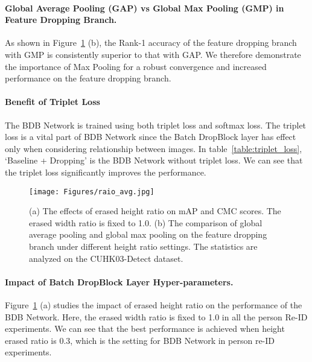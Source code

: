 \paragraph{Global Average Pooling (GAP) vs Global Max Pooling (GMP) in Feature Dropping Branch.}\vspace{-4mm}
As shown in Figure~\ref{fig:cuhk_ratio} (b), the Rank-1 accuracy of the feature dropping branch with GMP is consistently superior to that with GAP.
We therefore demonstrate the importance of Max Pooling \textcolor{myRed}{for} a robust convergence and increased performance on the feature dropping branch.

\paragraph{Benefit of Triplet Loss}\vspace{-4mm}
The BDB Network is trained using both triplet loss and softmax loss. The triplet loss is a vital part of BDB Network since the Batch DropBlock layer has effect only when considering relationship between images. In table~\ref{table:triplet_loss}, `Baseline + Dropping' is the BDB Network without triplet loss. We can see that the triplet loss significantly improves the performance.

\begin{figure}
\texttt{[image: Figures/raio\_avg.jpg]}
\vspace{-6mm}
\caption{(a) The effects of erased height ratio on mAP and CMC scores. The erased width ratio is fixed to 1.0. (b) The comparison of  global average pooling and global max pooling on the feature dropping branch under different height ratio settings. The statistics are analyzed on the CUHK03-Detect dataset.}
\label{fig:cuhk_ratio}
\vspace{2mm}
\end{figure}

\paragraph{Impact of Batch DropBlock Layer Hyper-parameters.}\vspace{-4mm}
Figure~\ref{fig:cuhk_ratio} (a) studies the impact of erased height ratio on the performance of the BDB Network.  
Here, the erased width ratio is fixed to 1.0 in all the person Re-ID experiments.
We can see that the best performance is achieved when height erased ratio is 0.3, which is the setting for BDB Network in person re-ID experiments.




